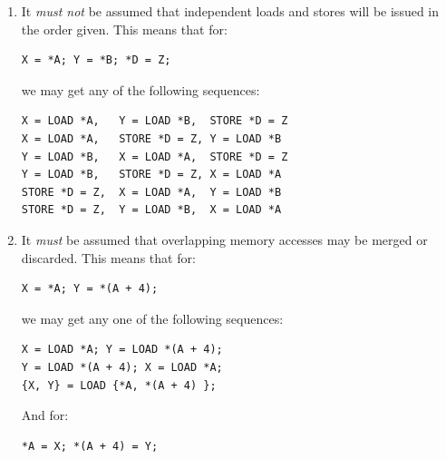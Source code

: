 \begin{enumerate}
\item	It \emph{must not} be assumed that independent loads and stores will
	be issued in the order given.  This means that for:

\begin{minipage}[t]{\columnwidth}
\scriptsize
\begin{verbatim}
X = *A; Y = *B; *D = Z;
\end{verbatim}
\end{minipage}

	we may get any of the following sequences:

\begin{minipage}[t]{\columnwidth}
\scriptsize
\begin{verbatim}
X = LOAD *A,   Y = LOAD *B,  STORE *D = Z
X = LOAD *A,   STORE *D = Z, Y = LOAD *B
Y = LOAD *B,   X = LOAD *A,  STORE *D = Z
Y = LOAD *B,   STORE *D = Z, X = LOAD *A
STORE *D = Z,  X = LOAD *A,  Y = LOAD *B
STORE *D = Z,  Y = LOAD *B,  X = LOAD *A
\end{verbatim}
\end{minipage}

\item	It \emph{must} be assumed that overlapping memory accesses may
	be merged or discarded.  This means that for:

\begin{minipage}[t]{\columnwidth}
\scriptsize
\begin{verbatim}
X = *A; Y = *(A + 4);
\end{verbatim}
\end{minipage}

	we may get any one of the following sequences:

\begin{minipage}[t]{\columnwidth}
\scriptsize
\begin{verbatim}
X = LOAD *A; Y = LOAD *(A + 4);
Y = LOAD *(A + 4); X = LOAD *A;
{X, Y} = LOAD {*A, *(A + 4) };
\end{verbatim}
\vspace{1pt}
\end{minipage}

	And for:

\begin{minipage}[t]{\columnwidth}
\scriptsize
\begin{verbatim}
*A = X; *(A + 4) = Y;
\end{verbatim}
\end{minipage}


\end{enumerate}
